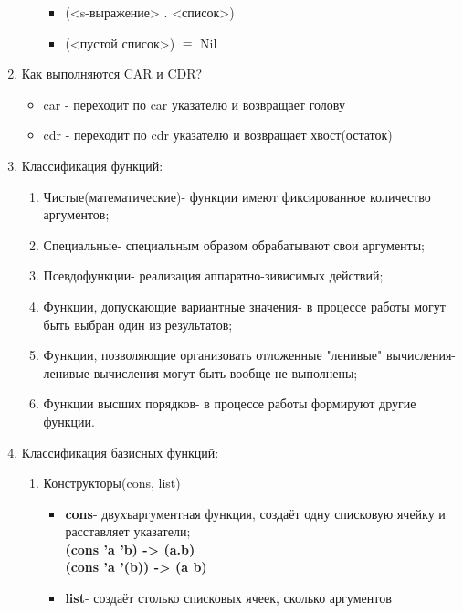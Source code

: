\begin{enumerate}
\begin{itemize}
                \begin{itemize}
                    \item (<s-выражение> . <список>)
                    \item (<пустой список>) $\equiv$ Nil
                \end{itemize}
        \end{itemize}
    \item\Large{Как выполняются CAR и CDR?}
        \begin{itemize}
            \item car - переходит по car указателю и возвращает голову
            \item cdr - переходит по cdr указателю и возвращает хвост(остаток)
        \end{itemize}
    \item Классификация функций:
        \begin{enumerate}
            \item Чистые(математические)- функции имеют фиксированное количество аргументов;
            \item Специальные- специальным образом обрабатывают свои аргументы;
            \item Псевдофункции- реализация аппаратно-зивисимых действий;
            \item Функции, допускающие вариантные значения- в процессе работы могут быть выбран один из результатов;
            \item Функции, позволяющие организовать отложенные "ленивые" вычисления- ленивые вычисления могут быть вообще не выполнены;
            \item Функции высших порядков- в процессе работы формируют другие функции.
        \end{enumerate}
    \item Классификация базисных функций:
        \begin{enumerate}
            \item Конструкторы(cons, list)
                \begin{itemize}
                    \item \textbf{cons}- двухъаргументная функция, создаёт одну списковую ячейку и расставляет указатели;
                        \\ \textbf{(cons 'a 'b) -> (a.b)} 
                        \\ \textbf{(cons 'a '(b)) -> (a b)}
                    \item \textbf{list}- создаёт столько списковых ячеек, сколько аргументов

\end{itemize}
\end{enumerate}
\end{enumerate}
